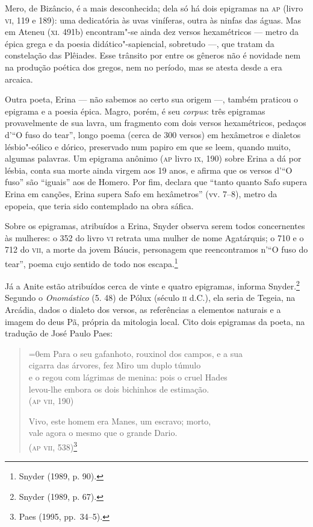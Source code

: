 Mero, de Bizâncio, é a mais desconhecida; dela só há dois epigramas na
\textsc{ap} (livro \textsc{vi}, 119 e 189): uma dedicatória às uvas viníferas,
outra às ninfas das águas. Mas em Ateneu (\textsc{xi}. 491b) encontram"-se ainda dez
versos hexamétricos --- metro da épica grega e da poesia didático"-sapiencial,
sobretudo ---, que tratam da constelação das Plêiades. Esse trânsito por entre os
gêneros não é novidade nem na produção poética dos gregos, nem no período, mas
se atesta desde a era arcaica.

Outra poeta, Erina --- não sabemos ao certo sua origem ---, também praticou o
epigrama e a poesia épica. Magro, porém, é seu \textit{corpus}: três epigramas
provavelmente de sua lavra, um fragmento com dois versos hexamétricos, pedaços
d’“O fuso do tear”, longo poema (cerca de 300 versos) em hexâmetros e dialetos
lésbio"-eólico e dórico, preservado num papiro em que se leem, quando muito,
algumas palavras. Um epigrama anônimo (\textsc{ap} livro \textsc{ix}, 190)
sobre Erina a dá por lésbia, conta sua morte ainda virgem aos 19 anos, e
afirma que os versos d’“O fuso” são ``iguais” aos de Homero. Por fim,
declara que ``tanto quanto Safo supera Erina em canções, Erina supera
Safo em hexâmetros” (vv. 7--8), metro da epopeia, que teria sido contemplado na
obra sáfica.

Sobre os epigramas, atribuídos a Erina, Snyder observa
serem todos concernentes às mulheres: o 352 do livro \textsc{vi}
retrata uma mulher de nome Agatárquis; o 710 e o 712 do \textsc{vii}, a morte da jovem
Báucis, personagem que reencontramos n’“O fuso do tear”, poema cujo sentido de
todo nos escapa.\footnote{ Snyder (1989, p. 90).}

Já a Anite estão atribuídos cerca de vinte e quatro
epigramas, informa Snyder.\footnote{ Snyder (1989, p. 67).} Segundo o \textit{Onomástico} (5. 48) de
Pólux (século \textsc{ii} d.C.), ela seria de Tegeia, na Arcádia, dados o dialeto dos
versos, as referências a elementos naturais e a imagem do deus Pã, própria da
mitologia local. Cito dois epigramas da poeta, na tradução de José Paulo Paes:

\begin{quote}\parindent=0em 
Para o seu gafanhoto, rouxinol dos campos, e a sua\\
cigarra das árvores, fez Miro um duplo túmulo\\
e o regou com lágrimas de menina: pois o cruel Hades\\
levou-lhe embora os dois bichinhos de estimação.\\
\mbox{}\hfill (\textsc{ap vii}, 190)

\smallskip

Vivo, este homem era Manes, um escravo; morto,\\
vale agora o mesmo que o grande Dario.\\
\mbox{}\hfill (\textsc{ap vii}, 538)\footnote{ Paes (1995, pp.~34--5).}
\end{quote}

